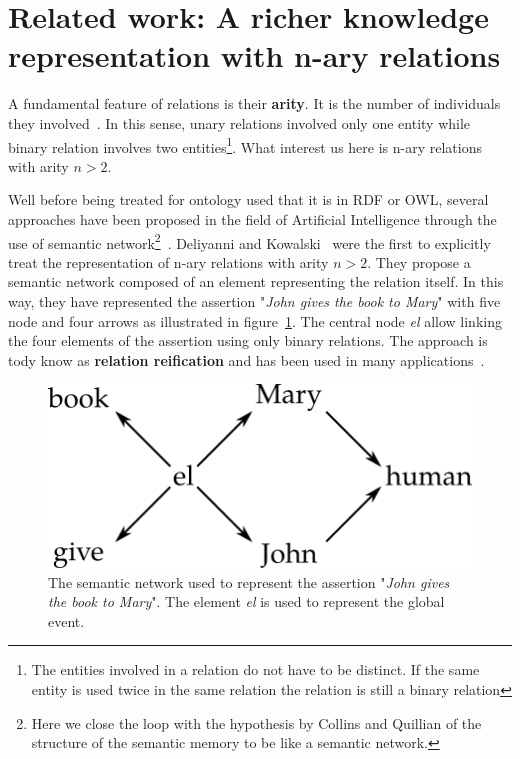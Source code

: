 \section[Related work]{Related work: A richer knowledge representation with n-ary relations}

A fundamental feature of relations is their \textbf{arity}. It is the number of individuals they involved~\cite{giunti_2019_representing}. In this sense, unary relations involved only one entity while binary relation involves two entities\footnote{The entities involved in a relation do not have to be distinct. If the same entity is used twice in the same relation the relation is still a binary relation}. What interest us here is n-ary relations with arity $n > 2$.

Well before being treated for ontology used that it is in RDF or OWL, several approaches have been proposed in the field of Artificial Intelligence through the use of semantic network\footnote{Here we close the loop with the hypothesis by Collins and Quillian of the structure of the semantic memory to be like a semantic network.}~\cite{brachman_1979_epistemological, sowa_2014_principles}. Deliyanni and Kowalski~\cite{deliyanni_1979_logic} were the first to explicitly treat the representation of n-ary relations with arity $n > 2$. They propose a semantic network composed of an element representing the relation itself. In this way, they have represented the assertion "\textit{John gives the book to Mary}" with five node and four arrows as illustrated in figure~\ref{fig:chap7_sem_net}. The central node \textit{el} allow linking the four elements of the assertion using only binary relations. The approach is tody know as \textbf{relation reification} and has been used in many applications~\cite{gangemi_2008_norms, welty_2006_reusable}.

\begin{figure}[ht!]
\centering
\includegraphics[scale=0.4]{figures/chapter7/semantic_net.png}
\caption{\label{fig:chap7_sem_net} The semantic network used to represent the assertion "\textit{John gives the book to Mary}". The element \textit{el} is used to represent the global event.}
\end{figure}

